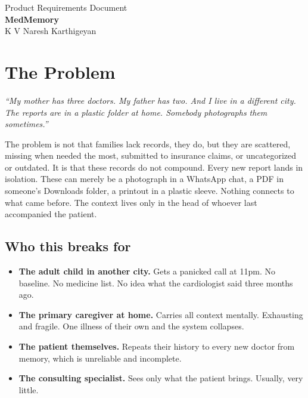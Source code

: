 \documentclass[11pt, a4paper]{article}
\begin{document}
\begin{center}
  {\large Product Requirements Document}\\[6pt]
  {\large\textbf{MedMemory}}\\[4pt]
  {\small K V Naresh Karthigeyan}
\end{center}

\vspace{3pt}

\section{The Problem}

\textit{``My mother has three doctors. My father has two. And I live in a different city. The reports are in a plastic folder at home. Somebody photographs them sometimes.''}

\vspace{4pt}

The problem is not that families lack records, they do, but they are scattered, missing when needed the most, submitted to insurance claims, or uncategorized or outdated. It is that these records do not compound. Every new report lands in isolation. These can merely be a photograph in a WhatsApp chat, a PDF in someone's Downloads folder, a printout in a plastic sleeve. Nothing connects to what came before. The context lives only in the head of whoever last accompanied the patient.

\subsection{Who this breaks for}

\begin{itemize}
  \item \textbf{The adult child in another city.} Gets a panicked call at 11pm. No baseline. No medicine list. No idea what the cardiologist said three months ago.
  \item \textbf{The primary caregiver at home.} Carries all context mentally. Exhausting and fragile. One illness of their own and the system collapses.
  \item \textbf{The patient themselves.} Repeats their history to every new doctor from memory, which is unreliable and incomplete.
  \item \textbf{The consulting specialist.} Sees only what the patient brings. Usually, very little.
\end{itemize}
\end{document}

